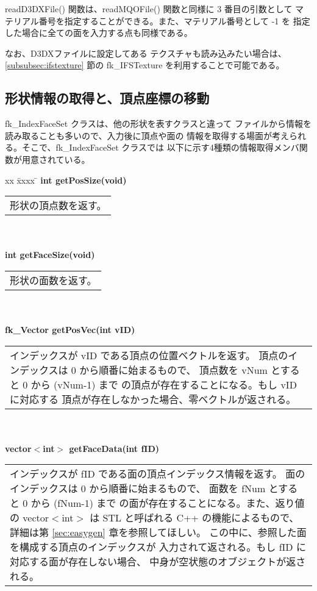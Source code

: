 readD3DXFile() 関数は、readMQOFile() 関数と同様に 3 番目の引数として
マテリアル番号を指定することができる。また、マテリアル番号として -1 を
指定した場合に全ての面を入力する点も同様である。

なお、D3DXファイルに設定してある
テクスチャも読み込みたい場合は、\ref{subsubsec:ifstexture} 節の
fk\_IFSTexture を利用することで可能である。

\subsection{形状情報の取得と、頂点座標の移動}
fk\_IndexFaceSet クラスは、他の形状を表すクラスと違って
ファイルから情報を読み取ることも多いので、入力後に頂点や面の
情報を取得する場面が考えられる。そこで、fk\_IndexFaceSet クラスでは
以下に示す4種類の情報取得メンバ関数が用意されている。
\begin{tabbing}
xx \= xxxx \= \kill
\> \textbf{int getPosSize(void)} \\
	\> \> \begin{tabular}{p{15cm}}
		形状の頂点数を返す。
	\end{tabular} \\ \\

\> \textbf{int getFaceSize(void)} \\
	\> \> \begin{tabular}{p{15cm}}
		形状の面数を返す。
	\end{tabular} \\ \\

\> \textbf{fk\_Vector getPosVec(int vID)} \\
	\> \> \begin{tabular}{p{15cm}}
		インデックスが vID である頂点の位置ベクトルを返す。
		頂点のインデックスは 0 から順番に始まるもので、
		頂点数を vNum とすると 0 から (vNum-1) まで
		の頂点が存在することになる。もし vID に対応する
		頂点が存在しなかった場合、零ベクトルが返される。
	\end{tabular} \\ \\

\> \textbf{vector\(<\)int\(>\) getFaceData(int fID)} \\
	\> \> \begin{tabular}{p{15cm}}
		インデックスが fID である面の頂点インデックス情報を返す。
		面のインデックスは 0 から順番に始まるもので、
		面数を fNum とすると 0 から (fNum-1) まで
		の面が存在することになる。また、返り値の
		vector\(<\)int\(>\) は STL と呼ばれる C++ の機能によるもので、
		詳細は第 \ref{sec:easygen} 章を参照してほしい。
		この中に、参照した面を構成する頂点のインデックスが
		入力されて返される。もし fID に対応する面が存在しない場合、
		中身が空状態のオブジェクトが返される。
	\end{tabular}
\end{tabbing}
